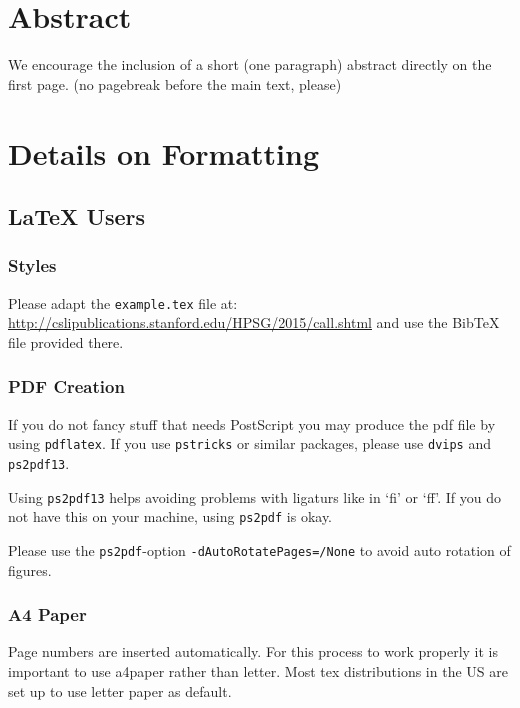 \documentclass[11pt,a4paper,fleqn]{article}
\begin{document}
\section{Abstract}

We encourage the inclusion of a short (one paragraph)  abstract directly on the first page.
(no pagebreak before the main text, please)


\section{Details on Formatting}

\subsection{\LaTeX{} Users}

\subsubsection{Styles}

Please adapt the \verb+example.tex+ file at:\newline
\url{http://cslipublications.stanford.edu/HPSG/2015/call.shtml}\newline
and use the BibTeX file provided there.

\subsubsection{PDF Creation}

If you do not fancy stuff that needs PostScript you may produce
the pdf file by using \verb+pdflatex+. If you use \verb+pstricks+ or
similar packages, please use \verb+dvips+ and \verb+ps2pdf13+.

Using \verb+ps2pdf13+ helps avoiding problems with ligaturs like in `fi'
or `ff'. If you do not have this on your machine, using \verb+ps2pdf+ is okay.

Please use the \verb+ps2pdf+-option \verb+-dAutoRotatePages=/None+  to avoid auto rotation
of figures.


\subsubsection{A4 Paper}

Page numbers are inserted automatically. For this process to work properly it is important to use
a4paper rather than letter. Most tex distributions in the US are set up to use letter paper as default.
\end{document}
